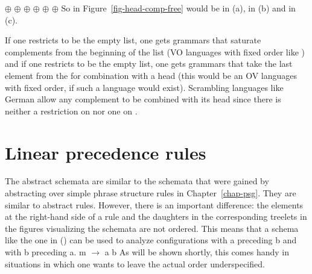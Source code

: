 \eal
\ex \eliste{} $\oplus$  $\oplus$  
\ex {} $\oplus$  $\oplus$  
\ex {} $\oplus$  $\oplus$ \eliste 
\zl
So  in Figure~\ref{fig-head-comp-free} would be \npnom in (a), \npdat in (b) and \npacc in (c).

If one restricts  to be the
empty list, one gets grammars that saturate complements from the beginning of the list (VO languages
with fixed order like ) and if one restricts  to be the empty list, one gets grammars that take the last
element from the \compsl for combination with a head (this would be an OV languages with fixed
order, if such a language would exist). Scrambling languages like German allow any
complement to be combined with its head since there is neither a restriction on  nor one on .



\section{Linear precedence rules}
\label{sec-lp-rules}

The abstract schemata are similar to the schemata that were gained by abstracting over simple phrase
structure rules in Chapter~\ref{chap-psg}. They are similar to abstract \xbar rules. However, there
is an important difference: the elements at the right-hand side of a rule and the daughters in the
corresponding treelets in the figures visualizing the schemata are not ordered. This means that a
schema like the one in () can be used to analyze configurations with a preceding b and with
b preceding a.
\ea
m $\to$ a b
\z
As will be shown shortly, this comes handy in situations in which one wants to leave the actual
order underspecified.

